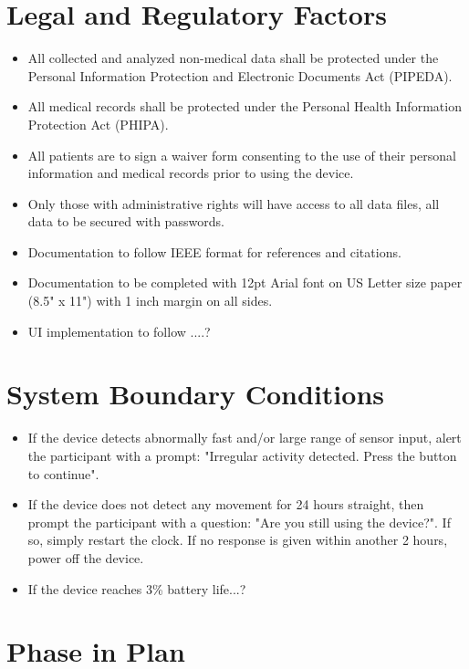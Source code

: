 \documentclass[12pt]{article}
\begin{document}
\section{Legal and Regulatory Factors}

\begin{itemize}
\item All collected and analyzed non-medical data shall be protected under the Personal Information Protection and Electronic Documents Act (PIPEDA).
\item All medical records shall be protected under the Personal Health Information Protection Act (PHIPA).
\item All patients are to sign a waiver form consenting to the use of their personal information and medical records prior to using the device.
\item Only those with administrative rights will have access to all data files, all data to be secured with passwords.
\item Documentation to follow IEEE format for references and citations.
\item Documentation to be completed with 12pt Arial font on US Letter size paper (8.5" x 11") with 1 inch margin on all sides.
\item UI implementation to follow ....?
\end{itemize}

\section{System Boundary Conditions}
\begin{itemize}
\item If the device detects abnormally fast and/or large range of sensor input, alert the participant with a prompt: "Irregular activity detected. Press the button to continue".
\item If the device does not detect any movement for 24 hours straight, then prompt the participant with a question: "Are you still using the device?". If so, simply restart the clock. If no response is given within another 2 hours, power off the device.
\item If the device reaches 3\% battery life...?
\end{itemize}

\section{Phase in Plan}
\end{document}
